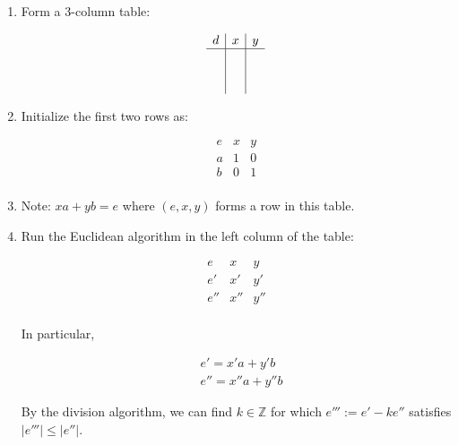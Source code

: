 \documentclass[11pt]{article}
\begin{document}
\begin{enumerate}
    \item Form a 3-column table:

          \[
              \begin{array}{c|c|c}
                  d & x & y \\
                  \hline
                    &   &   \\
                    &   &   \\
                    &   &   \\
              \end{array}
          \]

    \item Initialize the first two rows as:

          \[
              \begin{array}{c|c|c}
                  e & x & y \\
                  \hline
                  a & 1 & 0 \\
                  b & 0 & 1 \\
              \end{array}
          \]

    \item Note: \(xa + yb = e\) where \((e, x, y)\) forms a row in this table.

    \item Run the Euclidean algorithm in the left column of the table:

          \[
              \begin{array}{c|c|c}
                  e   & x   & y   \\
                  \hline
                  e'  & x'  & y'  \\
                  e'' & x'' & y'' \\
              \end{array}
          \]

          In particular,

          \[
              \begin{aligned}
                   & e' = x'a + y'b    \\
                   & e'' = x''a + y''b
              \end{aligned}
          \]

          By the division algorithm, we can find \(k \in \mathbb{Z}\) for which \(e''' :=
          e' - k e''\) satisfies \(|e'''| \leq |e''|\).


\end{enumerate}
\end{document}
